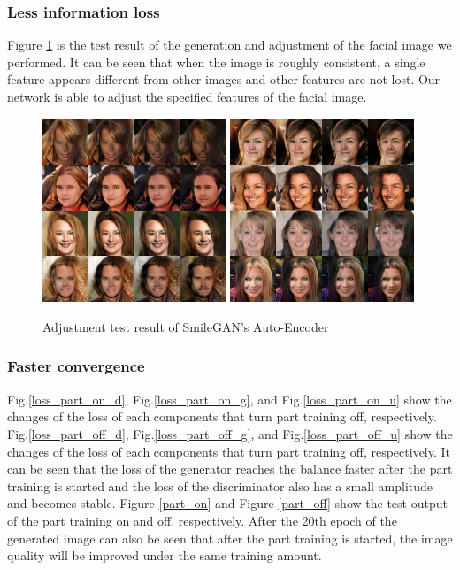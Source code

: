 \subsubsection*{Less information loss}
Figure \ref{adjust} is the test result of the generation and adjustment of the facial image we performed.
It can be seen that when the image is roughly consistent, a single feature appears different from other images and other features are not lost.
Our network is able to adjust the specified features of the facial image.

\begin{figure}
    \begin{center}
    \includegraphics[width=0.49\textwidth]{figures/result_adjust_1.png}
    \includegraphics[width=0.49\textwidth]{figures/result_adjust_2.png}
    \caption{Adjustment test result of SmileGAN's Auto-Encoder}
    \label{adjust}
    \end{center}
\end{figure}

\subsubsection*{Faster convergence}
Fig.\ref{loss_part_on_d}, Fig.\ref{loss_part_on_g}, and Fig.\ref{loss_part_on_u} show the changes of the loss of each components that turn part training off, respectively.
Fig.\ref{loss_part_off_d}, Fig.\ref{loss_part_off_g}, and Fig.\ref{loss_part_off_u} show the changes of the loss of each components that turn part training off, respectively.
It can be seen that the loss of the generator reaches the balance faster after the part training is started and the loss of the discriminator also has a small amplitude and becomes stable.
Figure \ref{part_on} and Figure \ref{part_off} show the test output of the part training on and off, respectively.
After the 20th epoch of the generated image can also be seen that after the part training is started, the image quality will be improved under the same training amount.

